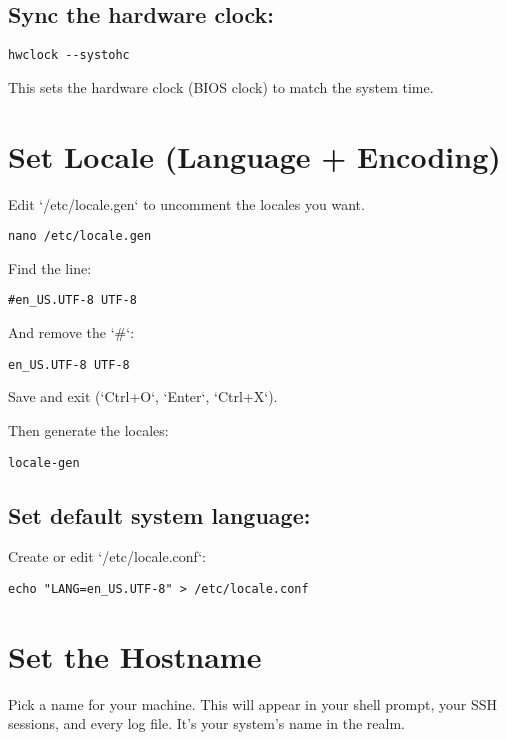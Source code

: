 \documentclass[12pt]{book}
\begin{document}
\subsection*{Sync the hardware clock:}

\begin{lstlisting}
hwclock --systohc
\end{lstlisting}

This sets the hardware clock (BIOS clock) to match the system time.

\section{Set Locale (Language + Encoding)}

Edit `/etc/locale.gen` to uncomment the locales you want.

\begin{lstlisting}
nano /etc/locale.gen
\end{lstlisting}

Find the line:

\begin{lstlisting}
#en_US.UTF-8 UTF-8
\end{lstlisting}

And remove the `#`:

\begin{lstlisting}
en_US.UTF-8 UTF-8
\end{lstlisting}

Save and exit (`Ctrl+O`, `Enter`, `Ctrl+X`).

Then generate the locales:

\begin{lstlisting}
locale-gen
\end{lstlisting}

\subsection*{Set default system language:}

Create or edit `/etc/locale.conf`:

\begin{lstlisting}
echo "LANG=en_US.UTF-8" > /etc/locale.conf
\end{lstlisting}

\section{Set the Hostname}

Pick a name for your machine. This will appear in your shell prompt, your SSH sessions, and every log file. It’s your system’s name in the realm.
\end{document}

